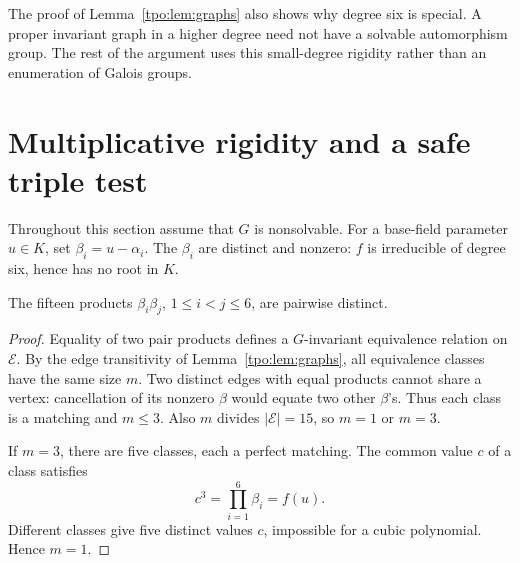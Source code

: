 \documentclass[11pt,letterpaper]{article}
\numberwithin{equation}{section}
\theoremstyle{definition}
\theoremstyle{remark}
\newcommand{\Edges}{\mathcal E}
\begin{document}
The proof of Lemma~\ref{tpo:lem:graphs} also shows why degree six is special.
A proper invariant graph in a higher degree need not have a solvable
automorphism group. The rest of the argument uses this small-degree rigidity
rather than an enumeration of Galois groups.

\section{Multiplicative rigidity and a safe triple test}
\label{tpo:sec:triple}

Throughout this section assume that $G$ is nonsolvable. For a base-field
parameter $u\in K$, set $\beta_i=u-\alpha_i$. The $\beta_i$ are distinct and
nonzero: $f$ is irreducible of degree six, hence has no root in $K$.

\begin{lemma}
\label{tpo:lem:products}
The fifteen products $\beta_i\beta_j$, $1\le i<j\le6$, are pairwise distinct.
\end{lemma}
\begin{proof}
Equality of two pair products defines a $G$-invariant equivalence relation
on $\Edges$. By the edge transitivity of Lemma~\ref{tpo:lem:graphs}, all equivalence
classes have the same size $m$. Two distinct edges with equal products cannot
share a vertex: cancellation of its nonzero $\beta$ would equate two other
$\beta$'s. Thus each class is a matching and $m\le3$. Also $m$ divides
$|\Edges|=15$, so $m=1$ or $m=3$.

If $m=3$, there are five classes, each a perfect matching. The common value
$c$ of a class satisfies
\[
 c^3=\prod_{i=1}^6\beta_i=f(u).
\]
Different classes give five distinct values $c$, impossible for a cubic
polynomial. Hence $m=1$.
\end{proof}
\end{document}
